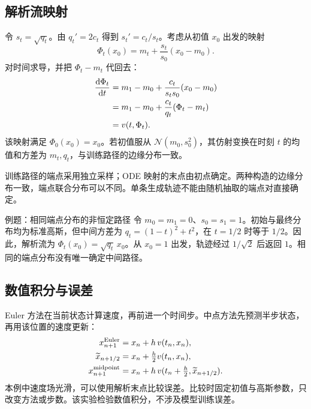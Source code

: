 \subsection{解析流映射}
令 $s_t=\sqrt{q_t}$。由 $q_t'=2c_t$ 得到 $s_t'=c_t/s_t$。考虑从初值 $x_0$ 出发的映射
\begin{equation}\label{eq:flow_map}
 \Phi_t(x_0)=m_t+\frac{s_t}{s_0}(x_0-m_0).
\end{equation}
对时间求导，并把 $\Phi_t-m_t$ 代回去：
\begin{align}\label{eq:flow_ode_check}
 \frac{\mathrm d\Phi_t}{\mathrm dt}
 &=m_1-m_0+\frac{c_t}{s_ts_0}(x_0-m_0)\notag\\
 &=m_1-m_0+\frac{c_t}{q_t}(\Phi_t-m_t)\notag\\
 &=v(t,\Phi_t).
\end{align}
该映射满足 $\Phi_0(x_0)=x_0$。若初值服从 $\mathcal N(m_0,s_0^2)$，其仿射变换在时刻 $t$ 的均值和方差为 $m_t,q_t$，与训练路径的边缘分布一致。

训练路径的端点采用独立采样；ODE 映射的末点由初点确定。两种构造的边缘分布一致，端点联合分布可以不同。单条生成轨迹不能由随机抽取的端点对直接确定。

\begin{worked}{例题：相同端点分布的非恒定路径}
令 $m_0=m_1=0$、$s_0=s_1=1$。初始与最终分布均为标准高斯，但中间方差为 $q_t=(1-t)^2+t^2$，在 $t=1/2$ 时等于 $1/2$。因此，解析流为 $\Phi_t(x_0)=\sqrt{q_t}\,x_0$。从 $x_0=1$ 出发，轨迹经过 $1/\sqrt2$ 后返回 $1$。相同的端点分布没有唯一确定中间路径。
\end{worked}

\subsection{数值积分与误差}
Euler 方法在当前状态计算速度，再前进一个时间步。中点方法先预测半步状态，再用该位置的速度更新：
\begin{align}\label{eq:flow_solvers}
 x_{n+1}^{\rm Euler}&=x_n+h\,v(t_n,x_n),\notag\\
 \widetilde x_{n+1/2}&=x_n+\tfrac h2 v(t_n,x_n),\notag\\
 x_{n+1}^{\rm midpoint}&=x_n+h\,v(t_n+\tfrac h2,\widetilde x_{n+1/2}).
\end{align}
本例中速度场光滑，可以使用解析末点比较误差。比较时固定初值与高斯参数，只改变方法或步数。该实验检验数值积分，不涉及模型训练误差。

